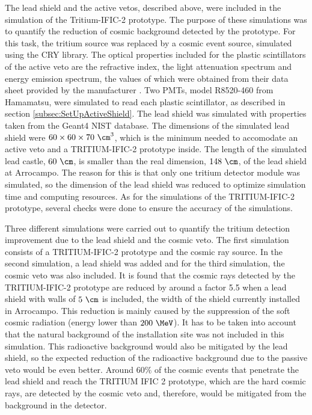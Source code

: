 The lead shield and the active vetos, described above, were included in the simulation of the Tritium-IFIC-2 prototype. The purpose of these simulations was to quantify the reduction of cosmic background detected by the prototype. For this task, the tritium source was replaced by a cosmic event source, simulated using the CRY library. The optical properties included for the plastic scintillators of the active veto are the refractive index, the light attenuation spectrum and energy emission spectrum, the values of which were obtained from their data sheet provided by the manufacturer \cite{ScintillatorVeto}. Two PMTs, model R8520-460 from Hamamatsu, were simulated to read each plastic scintillator, as described in section \ref{subsec:SetUpActiveShield}. The lead shield was simulated with properties taken from the Geant4 NIST database. The dimensions of the simulated lead shield were $60 \times 60 \times 70~\cm^3$, which is the minimum needed to accomodate an active veto and a TRITIUM-IFIC-2 prototype inside. The length of the simulated lead castle, $60~\cm$, is smaller than the real dimension, $148~\cm$, of the lead shield at Arrocampo. The reason for this is that only one tritium detector module was simulated, so the dimension of the lead shield was reduced to optimize simulation time and computing resources. As for the simulations of the TRITIUM-IFIC-2 prototype, several checks were done to ensure the accuracy of the simulations.

Three different simulations were carried out to quantify the tritium detection improvement due to the lead shield and the cosmic veto. The first simulation consists of a TRITIUM-IFIC-2 prototype and the cosmic ray source. In the second simulation, a lead shield was added and for the third simulation, the cosmic veto was also included. It is found that the cosmic rays detected by the TRITIUM-IFIC-2 prototype are reduced by around a factor 5.5 when a lead shield with walls of $5~\cm$ is included, the width of the shield currently installed in Arrocampo. This reduction is mainly caused by the suppression of the soft cosmic radiation (energy lower than $200~\MeV$). It has to be taken into account that the natural background of the installation site was not included in this simulation. This radioactive background would also be mitigated by the lead shield, so the expected reduction of the radioactive background due to the passive veto would be even better. Around $60\%$ of the cosmic events that penetrate the lead shield and reach the TRITIUM IFIC 2 prototype, which are the hard cosmic rays, are detected by the cosmic veto and, therefore, would be mitigated from the background in the detector.